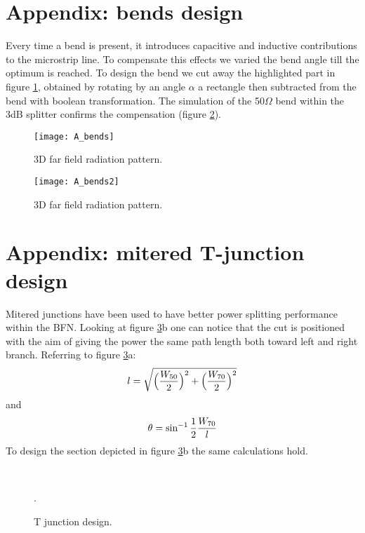 \newpage 
\appendix
\section{Appendix: bends design}

Every time a bend is present, it introduces capacitive and inductive contributions to the microstrip line. To compensate this effects we varied the bend angle till the optimum is reached. To design the bend we cut away the highlighted part in figure \ref{fig:A_bend1}, obtained by rotating by an angle $\alpha$ a rectangle then subtracted from the bend with boolean transformation. The simulation of the 50$\Omega$ bend within the 3dB splitter confirms the compensation (figure \ref{fig:A_bend}).

\begin{figure}[H] 
	\centering
	\texttt{[image: A\_bends]}
	\caption{3D far field radiation pattern.}
	\label{fig:A_bend1}
\end{figure}
 
\begin{figure}[H] 
	\centering
	\texttt{[image: A\_bends2]}
	\caption{3D far field radiation pattern.}
	\label{fig:A_bend}
\end{figure}

\newpage 
\section{Appendix: mitered T-junction design}

Mitered junctions have been used to have better power splitting performance within the BFN. Looking at figure \ref{fig:p3_mitered_junctions}b one can notice that the cut is positioned with the aim of giving the power the same path length both toward left and right branch. Referring to figure \ref{fig:p3_mitered_junctions}a:
\begin{equation}
l = \sqrt{\Big(\frac{W_{50}}{2}\Big)^2+\Big(\frac{W_{70}}{2}\Big)^2} \notag
\end{equation}
and
\begin{equation}
\theta = \sin^{-1}\frac{1}{2}\frac{W_{70}}{l} \notag
\end{equation}
To design the section depicted in figure \ref{fig:p3_mitered_junctions}b the same calculations hold.

\begin{figure}[H] 
	\centering
	\quad
	\\
	\caption{T junction design.}.
	\label{fig:p3_mitered_junctions}
\end{figure}


